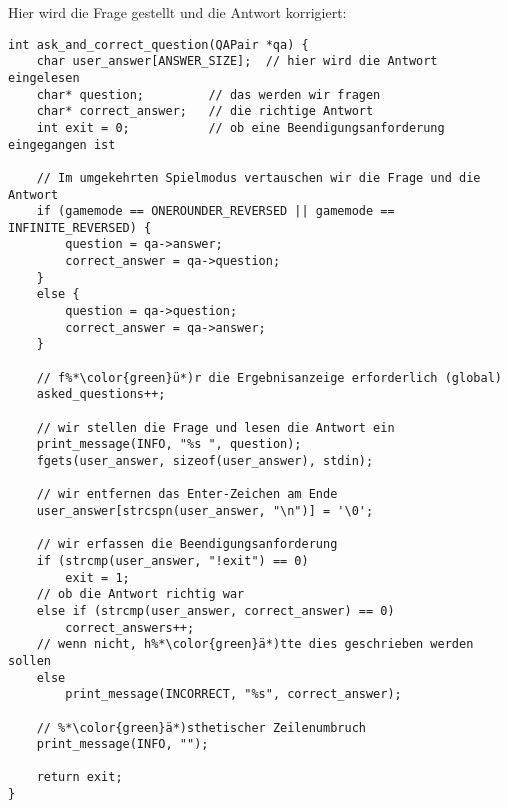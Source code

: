 \documentclass{article}
\begin{document}
\noindent Hier wird die Frage gestellt und die Antwort korrigiert:
\begin{lstlisting}
int ask_and_correct_question(QAPair *qa) {
    char user_answer[ANSWER_SIZE];  // hier wird die Antwort eingelesen
    char* question;         // das werden wir fragen
    char* correct_answer;   // die richtige Antwort
    int exit = 0;           // ob eine Beendigungsanforderung eingegangen ist

    // Im umgekehrten Spielmodus vertauschen wir die Frage und die Antwort
    if (gamemode == ONEROUNDER_REVERSED || gamemode == INFINITE_REVERSED) {
        question = qa->answer;
        correct_answer = qa->question;
    }
    else {
        question = qa->question;
        correct_answer = qa->answer;
    }

    // f%*\color{green}ü*)r die Ergebnisanzeige erforderlich (global)
    asked_questions++;

    // wir stellen die Frage und lesen die Antwort ein
    print_message(INFO, "%s ", question);
    fgets(user_answer, sizeof(user_answer), stdin);

    // wir entfernen das Enter-Zeichen am Ende
    user_answer[strcspn(user_answer, "\n")] = '\0';

    // wir erfassen die Beendigungsanforderung
    if (strcmp(user_answer, "!exit") == 0)
        exit = 1;
    // ob die Antwort richtig war
    else if (strcmp(user_answer, correct_answer) == 0)
        correct_answers++;
    // wenn nicht, h%*\color{green}ä*)tte dies geschrieben werden sollen
    else
        print_message(INCORRECT, "%s", correct_answer);

    // %*\color{green}ä*)sthetischer Zeilenumbruch
    print_message(INFO, "");
    
    return exit;
}
\end{lstlisting}
\end{document}
